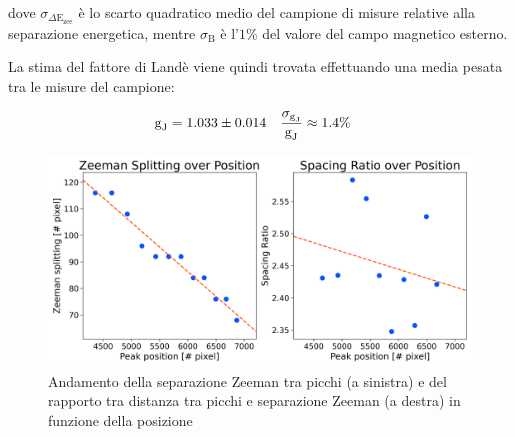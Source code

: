 \documentclass[twocolumn,10pt]{asme2ej}
\begin{document}
\noindent dove $\sigma_{\Delta \text{E}_{\text{zee}}}$ è lo scarto quadratico medio del campione di misure relative alla
separazione energetica, mentre $\sigma_{\text{B}}$ è l'$1\%$ del valore del campo magnetico esterno. 

La stima del fattore di Landè viene quindi trovata effettuando una media pesata tra le misure del campione:

\vspace{-15pt}
\begin{align*}
    \text{g}_{\text{J}} &= 1.033 \pm 0.014 & \frac{\sigma_{\text{g}_{\text{J}}}}{\text{g}_{\text{J}}} &\approx 1.4\%
    \vspace{-5pt}
\end{align*}

\begin{figure}
    \centering
    \includegraphics[width=\linewidth]{../Plots/Bon_zeeman_trend.png}
    \caption{Andamento della separazione Zeeman tra picchi (a sinistra) e del rapporto tra distanza tra picchi e separazione Zeeman (a destra) in funzione della posizione}
    \label{i:spacing_trend_Bon}
    \vspace{-10pt}
\end{figure}
\end{document}
